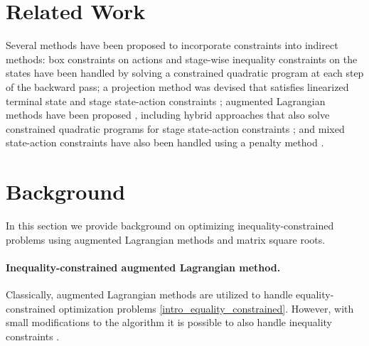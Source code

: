 \section{Related Work} \label{altro_related_work}
Several methods have been proposed to incorporate constraints into indirect methods: box constraints on actions \cite{tassa2014control} and stage-wise inequality constraints on the states \cite{xie2017differential,lin1991differential} have been handled by solving a constrained quadratic program at each step of the backward pass; a projection method was devised that satisfies linearized terminal state and stage state-action constraints \cite{giftthaler2018family}; augmented Lagrangian methods have been proposed \cite{plancher2017constrained}, including hybrid approaches that also solve constrained quadratic programs for stage state-action constraints \cite{lantoine2012hybrid,lin1991differential}; and mixed state-action constraints have also been handled using a penalty method \cite{farshidian2017efficient}. 

\section{Background} \label{altro_background}
In this section we provide background on optimizing inequality-constrained problems using augmented Lagrangian methods and matrix square roots.

\paragraph{Inequality-constrained augmented Lagrangian method.}
Classically, augmented Lagrangian methods are utilized to handle equality-constrained optimization problems \eqref{intro_equality_constrained}. However, with small modifications to the algorithm it is possible to also handle inequality constraints \cite{toussaint2014novel}. 

